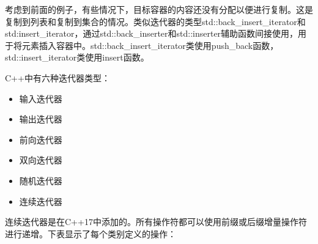 考虑到前面的例子，有些情况下，目标容器的内容还没有分配以便进行复制。这是复制到列表和复制到集合的情况。类似迭代器的类型std::back\_insert\_iterator和std:insert\_iterator，通过std::back\_inserter和std::inserter辅助函数间接使用，用于将元素插入容器中。std::back\_insert\_iterator类使用push\_back函数，std::insert\_iterator类使用insert函数。

C++中有六种迭代器类型：

\begin{itemize}
  \item
        输入迭代器

  \item
        输出迭代器

  \item
        前向迭代器

  \item
        双向迭代器

  \item
        随机迭代器

  \item
        连续迭代器
\end{itemize}

连续迭代器是在C++17中添加的。所有操作符都可以使用前缀或后缀增量操作符进行递增。下表显示了每个类别定义的操作：

